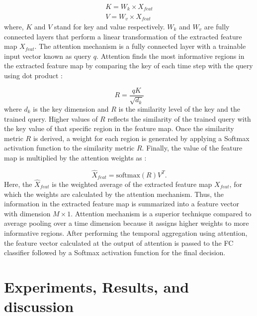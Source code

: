\documentclass[a4paper]{article}
\begin{document}
\begin{align}
K = W_{k}\times X_{feat} \\
V = W_{v} \times X_{feat}
\label{eq:k-v}
\end{align}
where, $K$ and $V$ stand for key and value respectively. $W_{k}$ and $W_{v}$ are fully connected layers that perform a linear transformation of the extracted feature map $X_{feat}$. The attention mechanism is a fully connected layer with a trainable input vector known as query $q$. Attention finds the most informative regions in the extracted feature map by comparing the key of each time step with the query using dot product \cite{vaswani2017attention}:

\begin{equation}
R = \dfrac{qK}{\sqrt{d_{k}}}
\label{eq:att1}
\end{equation}
where $d_k$ is the key dimension and $R$ is the similarity level of the key and the trained query. Higher values of $R$ reflects the similarity of the trained query with the key value of that specific region in the feature map.
Once the similarity metric $R$ is derived, a weight for each region is generated by applying a Softmax activation function to the similarity metric $R$. Finally, the value of the feature map is multiplied by the attention weights as \cite{vaswani2017attention}:

\begin{equation}
\hat{X}_{feat} = \text{softmax}(R)V^{T}.
\label{eq:att}
\end{equation}
Here, the $\hat{X}_{feat}$ is the weighted average  of the extracted feature map $X_{feat}$, for which the weights are calculated by the attention mechanism. Thus, the information in the extracted feature map is summarized into a feature vector with dimension $M \times 1$. Attention mechanism is a superior technique compared to average pooling over a time dimension because it assigns higher weights to more informative regions. After performing the temporal aggregation using attention, the feature vector calculated at the output of attention is passed to the FC classifier followed by a Softmax activation function for the final decision. 




\section{Experiments, Results, and discussion}
\label{sec:exp}
\end{document}
